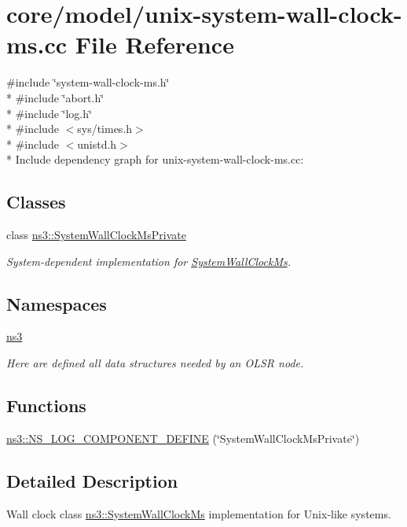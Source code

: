 \hypertarget{unix-system-wall-clock-ms_8cc}{}\section{core/model/unix-\/system-\/wall-\/clock-\/ms.cc File Reference}
\label{unix-system-wall-clock-ms_8cc}
{\ttfamily \#include \char`\"{}system-\/wall-\/clock-\/ms.\+h\char`\"{}}\\*
{\ttfamily \#include \char`\"{}abort.\+h\char`\"{}}\\*
{\ttfamily \#include \char`\"{}log.\+h\char`\"{}}\\*
{\ttfamily \#include $<$sys/times.\+h$>$}\\*
{\ttfamily \#include $<$unistd.\+h$>$}\\*
Include dependency graph for unix-\/system-\/wall-\/clock-\/ms.cc\+:
\subsection*{Classes}
\begin{DoxyCompactItemize}
\item 
class \hyperlink{classns3_1_1SystemWallClockMsPrivate}{ns3\+::\+System\+Wall\+Clock\+Ms\+Private}
\begin{DoxyCompactList}\small\item\em System-\/dependent implementation for \hyperlink{classns3_1_1SystemWallClockMs}{System\+Wall\+Clock\+Ms}. \end{DoxyCompactList}\end{DoxyCompactItemize}
\subsection*{Namespaces}
\begin{DoxyCompactItemize}
\item 
 \hyperlink{namespacens3}{ns3}
\begin{DoxyCompactList}\small\item\em Here are defined all data structures needed by an O\+L\+SR node. \end{DoxyCompactList}\end{DoxyCompactItemize}
\subsection*{Functions}
\begin{DoxyCompactItemize}
\item 
\hyperlink{namespacens3_a00f1378a92d10ffdf3c0e269289963d8}{ns3\+::\+N\+S\+\_\+\+L\+O\+G\+\_\+\+C\+O\+M\+P\+O\+N\+E\+N\+T\+\_\+\+D\+E\+F\+I\+NE} (\char`\"{}System\+Wall\+Clock\+Ms\+Private\char`\"{})
\end{DoxyCompactItemize}


\subsection{Detailed Description}
Wall clock class \hyperlink{classns3_1_1SystemWallClockMs}{ns3\+::\+System\+Wall\+Clock\+Ms} implementation for Unix-\/like systems. 